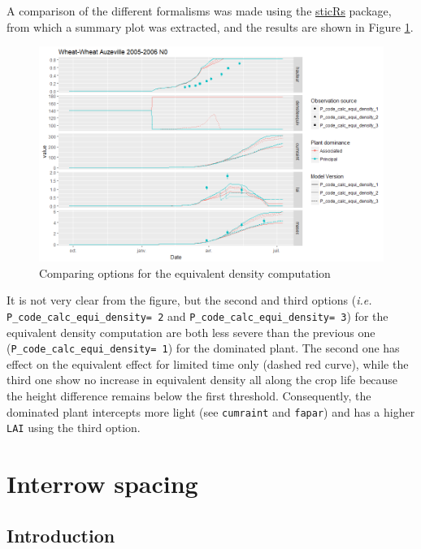 \documentclass[
]{book}
\begin{document}
A comparison of the different formalisms was made using the \href{https://github.com/VEZY/sticRs}{sticRs} package, from which a summary plot was extracted, and the results are shown in Figure \ref{fig:trgcomparison2}.

\begin{figure}
\centering
\includegraphics{img/Equi_dens_3.png}
\caption{\label{fig:trgcomparison2}Comparing options for the equivalent density computation}
\end{figure}

It is not very clear from the figure, but the second and third options (\emph{i.e.} \texttt{P\_code\_calc\_equi\_density=\ 2} and \texttt{P\_code\_calc\_equi\_density=\ 3}) for the equivalent density computation are both less severe than the previous one (\texttt{P\_code\_calc\_equi\_density=\ 1}) for the dominated plant. The second one has effect on the equivalent effect for limited time only (dashed red curve), while the third one show no increase in equivalent density all along the crop life because the height difference remains below the first threshold. Consequently, the dominated plant intercepts more light (see \texttt{cumraint} and \texttt{fapar}) and has a higher \texttt{LAI} using the third option.

\hypertarget{Interrow}{%
\chapter{Interrow spacing}\label{Interrow}}

\hypertarget{introduction-3}{%
\section{Introduction}\label{introduction-3}}
\end{document}
